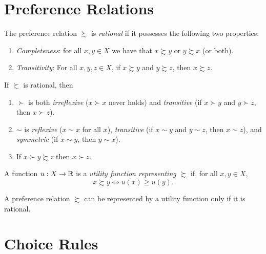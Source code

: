 \addtocounter{section}{1}

\section{Preference Relations}

\begin{defn}
    The preference relation $\succsim$ is \emph{rational} if it possesses the following two properties:
    \begin{enumerate}
        \item \emph{Completeness}: for all $x, y \in X$ we have that $x \succsim y$ or $y \succsim x$ (or both).
        \item \emph{Transitivity}: For all $x, y, z \in X$, if $x \succsim y$ and $y \succsim z$, then $x \succsim z$.
    \end{enumerate}
\end{defn}

\begin{prop}
    If $\succsim$ is rational, then 
    \begin{enumerate}
        \item $\succ$ is both \emph{irreflexive} ($x \succ x$ never holds) and \emph{transitive} (if $x \succ y$ and $y \succ z$, then $x \succ z$).
        \item $\sim$ is \emph{reflexive} ($x \sim x$ for all $x$), \emph{transitive} (if $x \sim y$ and $y \sim z$, then $x \sim z$), and \emph{symmetric} (if $x \sim y$, then $y \sim x$).
        \item If $x \succ y \succsim z$ then $x \succ z$.
    \end{enumerate}
\end{prop}

\begin{defn}
    A function $u: X \to \mathbb{R}$ is a \emph{utility function representing $\succsim$} if, for all $x, y \in X$,
    \begin{equation*}
        x \succsim y \iff u(x) \geq u(y).
    \end{equation*}
\end{defn}

\begin{prop}
    A preference relation $\succsim$ can be represented by a utility function only if it is rational.
\end{prop}

\section{Choice Rules}

